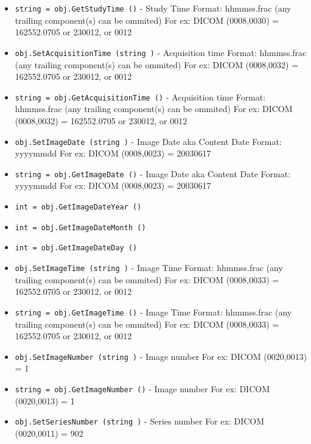 \begin{itemize}
\item  \verb|string = obj.GetStudyTime ()| -  Study Time
 Format: hhmmss.frac (any trailing component(s) can be ommited)
 For ex: DICOM (0008,0030) = 162552.0705 or 230012, or 0012

\item  \verb|obj.SetAcquisitionTime (string )| -  Acquisition time
 Format: hhmmss.frac (any trailing component(s) can be ommited)
 For ex: DICOM (0008,0032) = 162552.0705 or 230012, or 0012

\item  \verb|string = obj.GetAcquisitionTime ()| -  Acquisition time
 Format: hhmmss.frac (any trailing component(s) can be ommited)
 For ex: DICOM (0008,0032) = 162552.0705 or 230012, or 0012

\item  \verb|obj.SetImageDate (string )| -  Image Date aka Content Date
 Format: yyyymmdd
 For ex: DICOM (0008,0023) = 20030617

\item  \verb|string = obj.GetImageDate ()| -  Image Date aka Content Date
 Format: yyyymmdd
 For ex: DICOM (0008,0023) = 20030617

\item  \verb|int = obj.GetImageDateYear ()|

\item  \verb|int = obj.GetImageDateMonth ()|

\item  \verb|int = obj.GetImageDateDay ()|

\item  \verb|obj.SetImageTime (string )| -  Image Time
 Format: hhmmss.frac (any trailing component(s) can be ommited)
 For ex: DICOM (0008,0033) = 162552.0705 or 230012, or 0012

\item  \verb|string = obj.GetImageTime ()| -  Image Time
 Format: hhmmss.frac (any trailing component(s) can be ommited)
 For ex: DICOM (0008,0033) = 162552.0705 or 230012, or 0012

\item  \verb|obj.SetImageNumber (string )| -  Image number
 For ex: DICOM (0020,0013) = 1

\item  \verb|string = obj.GetImageNumber ()| -  Image number
 For ex: DICOM (0020,0013) = 1

\item  \verb|obj.SetSeriesNumber (string )| -  Series number
 For ex: DICOM (0020,0011) = 902


\end{itemize}
